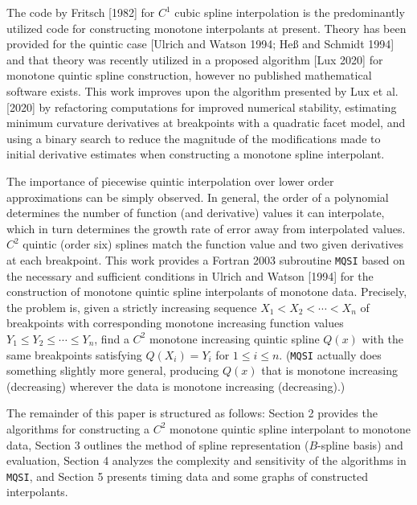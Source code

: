 The code by Fritsch [1982] for $C^1$ cubic spline interpolation is the
predominantly utilized code for constructing monotone interpolants at
present. Theory has been provided for the quintic case [Ulrich and
Watson 1994; He{\ss} and Schmidt 1994] and that theory was recently
utilized in a proposed algorithm [Lux 2020] for monotone quintic
spline construction, however no published mathematical software
exists. This work improves upon the algorithm presented by Lux et al.
[2020] by refactoring computations for improved numerical stability,
estimating minimum curvature derivatives at breakpoints with a
quadratic facet model, and using a binary search to reduce the
magnitude of the modifications made to initial derivative estimates
when constructing a monotone spline interpolant.

The importance of piecewise quintic interpolation over lower order
approximations can be simply observed. In general, the order of a
polynomial determines the number of function (and derivative) values
it can interpolate, which in turn determines the growth rate of error
away from interpolated values. $C^2$ quintic (order six) splines
match the function value and two given derivatives at each breakpoint.
This work provides a Fortran 2003 subroutine {\tt MQSI} based on the
necessary and sufficient conditions in Ulrich and Watson [1994] for the
construction of monotone quintic spline interpolants of monotone data.
Precisely, the problem is, given a strictly increasing sequence $X_1<X_2<
\cdots <X_n$ of breakpoints with corresponding monotone increasing
function values $Y_1\le Y_2\le \cdots \le Y_n$, find a $C^2$ monotone
increasing quintic spline $Q(x)$ with the same breakpoints satisfying
$Q(X_i)=Y_i$ for $1\le i\le n$. ({\tt MQSI} actually does something slightly
more general, producing $Q(x)$ that is monotone increasing (decreasing)
wherever the data is monotone increasing (decreasing).)

The remainder of this paper is structured as follows: Section 2 provides
the algorithms for constructing a $C^2$ monotone quintic spline interpolant
to monotone data, Section 3 outlines the method of spline representation
($B$-spline basis) and evaluation, Section 4 analyzes the complexity and
sensitivity of the algorithms in {\tt MQSI}, and Section 5 presents 
timing data and some graphs of constructed interpolants.


